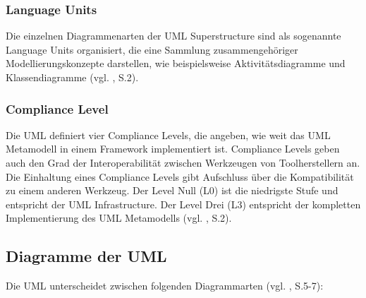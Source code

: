 \subsubsection{Language Units}
Die einzelnen Diagrammenarten der UML Superstructure sind als sogenannte Language Units organisiert, die eine Sammlung zusammengehöriger Modellierungskonzepte darstellen, wie beispielsweise Aktivitätsdiagramme und Klassendiagramme (vgl. \citep{OMG2009}, S.2).


\subsubsection{Compliance Level}\label{mod-uml-compliance}
Die UML definiert vier Compliance Levels, die angeben, wie weit das UML Metamodell in einem Framework implementiert ist. Compliance Levels geben auch den Grad der Interoperabilität zwischen Werkzeugen von Toolherstellern an. Die Einhaltung eines Compliance Levels gibt Aufschluss über die Kompatibilität zu einem anderen Werkzeug. Der Level Null (L0) ist die niedrigste Stufe und entspricht der UML Infrastructure. Der Level Drei (L3) entspricht der kompletten Implementierung des UML Metamodells (vgl. \citep{OMG2009}, S.2).

\subsection{Diagramme der UML}

Die UML unterscheidet zwischen folgenden Diagrammarten (vgl. \citep{PilonePitman2005}, S.5-7):

